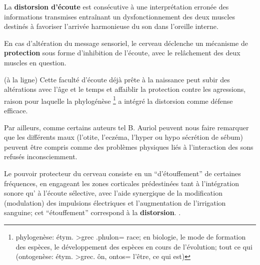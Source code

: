 
La \textbf{distorsion d'écoute} est consécutive à une interprétation
erronée des informations transmises entraînant un dysfonctionnement
des deux muscles destinés à favoriser l'arrivée
harmonieuse du son dans l'oreille interne.

En cas d'altération du message sensoriel,
le cerveau déclenche un mécanisme de\textbf{ protection} sous forme
d'inhibition de l'écoute, avec le relâchement des deux muscles en
question.

(à la ligne)
Cette faculté d'écoute déjà prête à la naissance peut subir des
altérations avec l'âge et
le temps et affaiblir la protection contre les agressions, raison pour
laquelle la phylogénèse \footnote{ phylogenèse: étym. >grec .phulon=
  race; en biologie, le mode de formation des espèces, le développement
  des espèces en cours de l'évolution; tout ce qui (ontogenèse: étym. >grec. ôn, ontos= l'être,
ce qui est)}  a intégré la distorsion comme défense
efficace.

Par ailleurs, comme certains auteurs tel B. Auriol peuvent nous faire
remarquer que 
les différents maux (l'otite, l'eczéma, l'hyper
ou hypo sécrétion de sébum) peuvent être compris comme des problèmes physiques liés à l'interaction des sons refusés
inconsciemment.  \autocite  [19--20] {auriol:cle}

Le pouvoir protecteur du cerveau consiste en un  ``d'étouffement'' de
certaines fréquences,  en engageant les zones corticales prédestinées
tant à 
l'intégration sonore qu' à l'écoute sélective,  avec l'aide synergique de la
modification (modulation) des impulsions électriques et l'augmentation de
l'irrigation sanguine\autocite [14] {auriol:cle}; 
cet ``étouffement'' correspond à la
\textbf{distorsion}.
\autocite{tomatis:education}.

  



  




 




  


